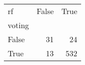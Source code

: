 \begin{tabular}{lrr}
\toprule
rf &  False &  True  \\
voting &        &        \\
\midrule
False  &     31 &     24 \\
True   &     13 &    532 \\
\bottomrule
\end{tabular}
